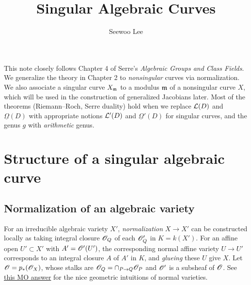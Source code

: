 \documentclass[letterpaper, 12pt]{article}
\begin{document}

\title{Singular Algebraic Curves}


\author{Seewoo Lee}
\date{}


\maketitle



This note closely follows Chapter 4 of Serre's \emph{Algebraic Groups and Class Fields}.
We generalize the theory in Chapter 2 to \emph{nonsingular} curves via normalization.
We also associate a singular curve $X_{\mathfrak{m}}$ to a modulus $\mathfrak{m}$ of a nonsingular curve $X$, which will be used in the construction of generalized Jacobians later.
Most of the theorems (Riemann--Roch, Serre duality) hold when we replace $\mathcal{L}(D)$ and $\underline{\Omega}(D)$ with appropriate notions $\mathcal{L}'(D)$ and $\underline{\Omega}'(D)$ for singular curves, and the genus $g$ with \emph{arithmetic} genus.



\section{Structure of a singular algebraic curve}

\subsection{Normalization of an algebraic variety}

For an irreducible algebraic variety $X'$, \emph{normalization} $X \to X'$ can be constructed locally as taking integral closure $\mathscr{O}_Q$ of each $\mathscr{O}'_Q$ in $K = k(X')$.
For an affine open $U' \subset X'$ with $A' = \mathscr{O}'(U')$, the corresponding normal affine variety $U \to U'$ corresponds to an integral closure $A$ of $A'$ in $K$, and \emph{glueing} these $U$ give $X$.
Let $\mathscr{O} = p_\ast(\mathscr{O}_X)$, whose stalks are $\mathscr{O}_Q = \cap_{P\to Q} \mathscr{O}_P$ and $\mathscr{O}'$ is a subsheaf of $\mathscr{O}$.
See \href{https://mathoverflow.net/questions/109395/is-there-a-geometric-intuition-underlying-the-notion-of-normal-varieties}{this MO answer} for the nice geometric intuitions of normal varieties.
\end{document}
